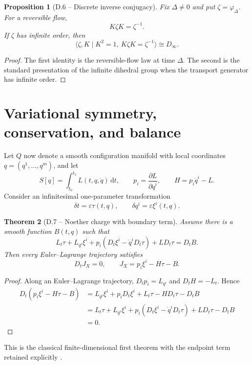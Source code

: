 \documentclass[11pt,letterpaper]{article}
\theoremstyle{dynamicsstyle}
\newtheorem{theorem}{Theorem}[section]
\newtheorem{proposition}[theorem]{Proposition}
\newcommand{\dd}{\,\mathrm d}
\newcommand{\Flow}{\varphi}
\begin{document}
\begin{proposition}[D.6 -- Discrete inverse conjugacy]\label{prop:reversible}
Fix $\Delta\ne0$ and put $\zeta=\Flow_\Delta$.  For a reversible flow,
\[
K\zeta K=\zeta^{-1}.
\]
If $\zeta$ has infinite order, then
\[
\langle \zeta,K\mid K^2=1,\ K\zeta K=\zeta^{-1}\rangle\cong D_\infty.
\]
\end{proposition}

\begin{proof}
The first identity is the reversible-flow law at time $\Delta$.  The second is the standard presentation of the infinite dihedral group when the transport generator has infinite order.
\end{proof}

\section{Variational symmetry, conservation, and balance}\label{sec:noether}

Let $Q$ now denote a smooth configuration manifold with local coordinates $q=(q^1,\ldots,q^m)$, and let
\[
S[q]=\int_{t_0}^{t_1}L(t,q,\dot q)\dd t,
\qquad
p_i=\frac{\partial L}{\partial\dot q^i},
\qquad
H=p_i\dot q^i-L.
\]
Consider an infinitesimal one-parameter transformation
\[
\delta t=\varepsilon\tau(t,q),
\qquad
\delta q^i=\varepsilon\xi^i(t,q).
\]

\begin{theorem}[D.7 -- Noether charge with boundary term]\label{thm:noether}
Assume there is a smooth function $B(t,q)$ such that
\[
L_t\tau+L_{q^i}\xi^i
+p_i(D_t\xi^i-\dot q^iD_t\tau)
+L D_t\tau
=D_tB.
\]
Then every Euler--Lagrange trajectory satisfies
\[
D_tJ_X=0,
\qquad
J_X=p_i\xi^i-H\tau-B.
\]
\end{theorem}

\begin{proof}
Along an Euler--Lagrange trajectory, $D_tp_i=L_{q^i}$ and $D_tH=-L_t$.  Hence
\begin{align*}
D_t(p_i\xi^i-H\tau-B)
&=L_{q^i}\xi^i+p_iD_t\xi^i+L_t\tau-H D_t\tau-D_tB\\
&=L_t\tau+L_{q^i}\xi^i
+p_i(D_t\xi^i-\dot q^iD_t\tau)
+L D_t\tau-D_tB\\
&=0.
\end{align*}
\end{proof}

This is the classical finite-dimensional first theorem with the endpoint term retained explicitly \cite{Noether,Arnold,MarsdenRatiu}.
\end{document}

